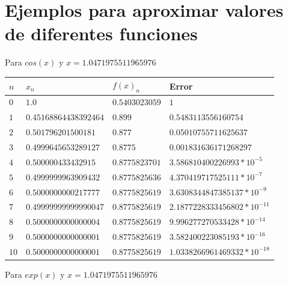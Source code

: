 \documentclass[12pt]{article}
\begin{document}
    \section {Ejemplos para aproximar valores de diferentes funciones}
    Para $cos(x)$ y $x = 1.0471975511965976$
        \begin{center}
            \begin{tabular}{|l|l|l|l|} \hline
            $n$ & $x_{n}$ & $f(x)_{n}$ & Error \\
            \hline \hline
            $0$ & $1.0$ &  $0.5403023059$ & $1$    \\
            \hline 
            $1$ & $0.45168864438392464$ & $0.899$ & $0.5483113556160754$\\
            \hline 
            $2$ & $0.501796201500181$ & $0.877$ & $0.05010755711625637$\\
            \hline 
            $3$ & $0.4999645653289127$ & $0.8775$ & $0.001831636171268297$\\
            \hline 
            $4$ & $0.500000433432915$ & $0.8775823701$ & $3.586810400226993 * 10^{-5}$\\
            \hline 
            $5$ & $0.4999999963909432$ & $0.8775825636$ & $4.370419717525111 * 10^{-7}$\\
            \hline 
            $6$ & $0.5000000000217777$ & $0.8775825619$ & $ 3.6308344847385137 * 10^{-9}$\\
            \hline 
            $7$ & $0.49999999999990047$ & $0.8775825619$ & $2.1877228333456802 * 10^{-11}$\\
            \hline 
            $8$ & $0.5000000000000004$ & $0.8775825619$ & $9.996277270533428 * 10^{-14}$\\
            \hline 
            $9$ & $0.5000000000000001$ & $0.8775825619$ & $3.582400223085193 * 10^{-16}$\\
            \hline 
            $10$ & $0.5000000000000001$ & $0.8775825619$ & $1.0338266961469332 * 10^{-18}$\\
            \hline
            \end{tabular}
        \end{center}
    Para $exp(x)$ y $x = 1.0471975511965976$
\end{document}
